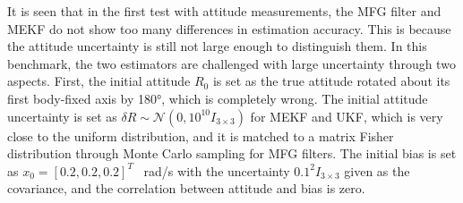 It is seen that in the first test with attitude measurements, the MFG filter and MEKF do not show too many differences in estimation accuracy.
This is because the attitude uncertainty is still not large enough to distinguish them.
In this benchmark, the two estimators are challenged with large uncertainty through two aspects.
First, the initial attitude $R_0$ is set as the true attitude rotated about its first body-fixed axis by \ang{180}, which is completely wrong.
The initial attitude uncertainty is set as $\delta R \sim \mathcal{N}(0,10^{10}I_{3\times3})$ for MEKF and UKF, which is very close to the uniform distribution, and it is matched to a matrix Fisher distribution through Monte Carlo sampling for MFG filters.
The initial bias is set as $x_0 = [0.2,0.2,0.2]^T$ \SI{}{\radian/\second} with the uncertainty $0.1^2 I_{3\times 3}$ given as the covariance, and the correlation between attitude and bias is zero.


